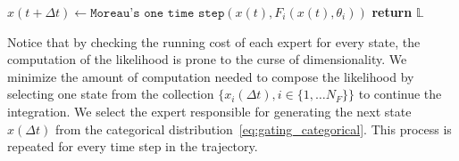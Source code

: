 \begin{enumerate}
\begin{algorithm}[tb]
\begin{algorithmic}[1]
                \State $x(t + \Delta t) \leftarrow \texttt{Moreau's one time step}(x(t), F_i(x(t), \theta_i))$
                \EndFor
            \State \textbf{return} $\mathbb{L}$
        \end{algorithmic}
    \end{algorithm}
    Notice that by checking the running cost of each expert for every state, the
    computation of the likelihood is prone to the curse of dimensionality.
    We minimize the amount of computation needed to compose the likelihood by
    selecting one state from the collection $\{ x_i(\Delta t) , i \in \{1,
    \dots N_F \}\}$ to continue the integration.
    We select the expert responsible for generating the next state $x(\Delta t)$ from the
    categorical distribution~\eqref{eq:gating_categorical}.
    This process is repeated for every time step in the trajectory.


\end{enumerate}
